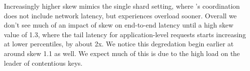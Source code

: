 Increasingly higher skew mimics the single shard setting, where \protocol's coordination does not include network latency, but experiences overload sooner.
Overall we don't see much of an impact of skew on end-to-end latency until a high skew value of 1.3, where the tail latency for application-level requests starts increasing at lower percentiles, by about 2x. We notice this degredation begin earlier at around skew 1.1 as well. We expect much of this is due to the high load on the leader of contentious keys.


